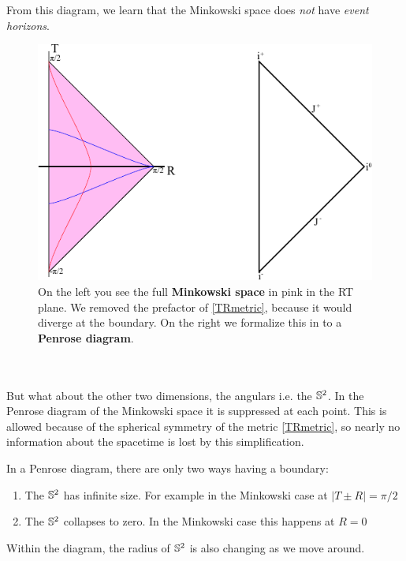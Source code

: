 	From this diagram, we learn that the Minkowski space does \textit{not} have \textit{event horizons}.
	\begin{figure}[tbp]	
		\begin{center}
			\includegraphics[scale=1]{flatpenrose}
		\end{center}
		\caption{On the left you see the full \textbf{Minkowski space} in pink in the RT plane. We removed the prefactor of \eqref{TRmetric}, because it would diverge at the boundary. On the right we formalize this in to a \textbf{Penrose diagram}.}\label{flatpenrose}
	\end{figure}
	\\ \\
	But what about the other two dimensions, the angulars i.e. the $\mathbb{S}^2$. In the Penrose diagram of the Minkowski space it is suppressed at each point. This is allowed because of the spherical symmetry of the metric \eqref{TRmetric}, so nearly no information about the spacetime is lost by this simplification. 
	
	In a Penrose diagram, there are only two ways having a boundary:
	\begin{enumerate}
		\item The $\mathbb{S}^2$ has infinite size. For example in the Minkowski case at $|T \pm R| = \pi/2$
		\item The $\mathbb{S}^2$ collapses to zero. In the Minkowski case this happens at $R=0$
	\end{enumerate}
	Within the diagram, the radius of $\mathbb{S}^2$ is also changing as we move around. 	
	
